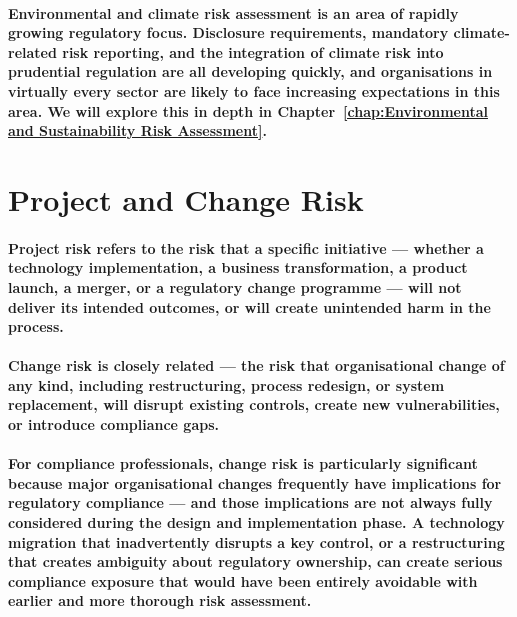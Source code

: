 \paragraph{Environmental and climate risk assessment is an area of rapidly growing regulatory focus. Disclosure requirements, mandatory climate-related risk reporting, and the integration of climate risk into prudential regulation are all developing quickly, and organisations in virtually every sector are likely to face increasing expectations in this area. We will explore this in depth in Chapter~\ref{chap:Environmental and Sustainability Risk Assessment}.}

\section{Project and Change Risk}
\paragraph{\textbf{Project risk} refers to the risk that a specific initiative — whether a technology implementation, a business transformation, a product launch, a merger, or a regulatory change programme — will not deliver its intended outcomes, or will create unintended harm in the process.}
\paragraph{\textbf{Change risk} is closely related — the risk that organisational change of any kind, including restructuring, process redesign, or system replacement, will disrupt existing controls, create new vulnerabilities, or introduce compliance gaps.}
\paragraph{For compliance professionals, change risk is particularly significant because major organisational changes frequently have implications for regulatory compliance — and those implications are not always fully considered during the design and implementation phase. A technology migration that inadvertently disrupts a key control, or a restructuring that creates ambiguity about regulatory ownership, can create serious compliance exposure that would have been entirely avoidable with earlier and more thorough risk assessment.}

